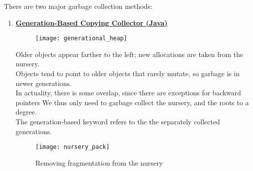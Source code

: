 \documentclass[../../lecture_notes.tex]{subfiles}
\begin{document}
\noindent There are two major garbage collection methods:
	\begin{enumerate} [itemsep=0mm]
	\item \textbf{\underline{Generation-Based Copying Collector (Java)}}

		\begin{figure}[H]
			\centering
			\texttt{[image: generational\_heap]}
			\label{fig:test}
		\end{figure}



		Older objects appear farther to the left; new allocations are taken from the nursery.\\
		Objects tend to point to older objects that rarely mutate, so garbage is in newer generations.\\
		In actuality, there is some overlap, since there are exceptions for backward pointers
		We thus only need to garbage collect the nursery, and the roots to a degree.\\
		The generation-based keyword refers to the the separately collected generations.\\

		\begin{figure}[H]
			\centering
			\texttt{[image: nursery\_pack]}
			\caption{Removing fragmentation from the nursery}
			\label{fig:test}
		\end{figure}



\end{enumerate}
\end{document}
